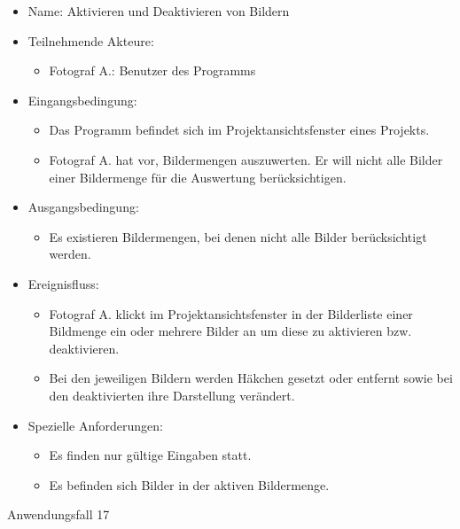	\begin{itemize}
		\item Name: Aktivieren und Deaktivieren von Bildern
		\item Teilnehmende Akteure:
		\begin{itemize}
			\item	Fotograf A.: Benutzer des Programms		
		\end{itemize}
		\item Eingangsbedingung:
		\begin{itemize}
			\item	Das Programm befindet sich im Projektansichtsfenster eines Projekts.
			\item Fotograf A. hat vor, Bildermengen auszuwerten. Er will nicht alle Bilder einer Bildermenge für die Auswertung berücksichtigen.
		\end{itemize}
		\item Ausgangsbedingung:
		\begin{itemize}
			\item	Es existieren Bildermengen, bei denen nicht alle Bilder berücksichtigt werden.	
		\end{itemize}
		\item Ereignisfluss:
		\begin{itemize}
			\item Fotograf A. klickt im Projektansichtsfenster in der Bilderliste einer Bildmenge ein oder mehrere Bilder an um diese zu aktivieren bzw. deaktivieren.
			\item Bei den jeweiligen Bildern werden Häkchen gesetzt oder entfernt sowie bei den deaktivierten ihre Darstellung verändert.
		\end{itemize}
		\item Spezielle Anforderungen:
		\begin{itemize}
			\item	Es finden nur gültige Eingaben statt.
			\item Es befinden sich Bilder in der aktiven Bildermenge.
		\end{itemize}			
	\end{itemize}
	
	\begin{description}
		\item[Anwendungsfall 17]
	\end{description}
	
